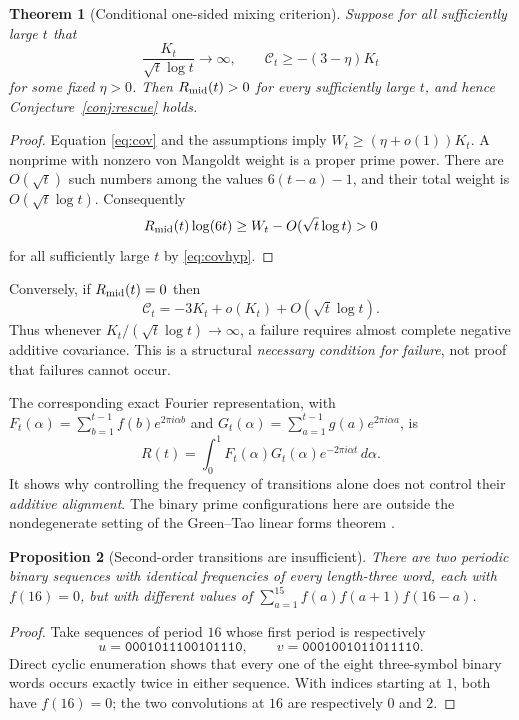\documentclass[11pt,a4paper]{article}
\newtheorem{theorem}{Theorem}[section]
\newtheorem{proposition}[theorem]{Proposition}
\theoremstyle{definition}
\begin{document}
\begin{theorem}[Conditional one-sided mixing criterion]\label{thm:cov}
Suppose for all sufficiently large $t$ that
\begin{equation}\label{eq:covhyp}
 \frac{K_t}{\sqrt t\log t}\longrightarrow\infty,
 \qquad \mathcal C_t\ge-(3-\eta)K_t
\end{equation}
for some fixed $\eta>0$. Then $R_{\rm mid}(t)>0$ for every
sufficiently large $t$, and hence Conjecture~\ref{conj:rescue} holds.
\end{theorem}
\begin{proof}
Equation \eqref{eq:cov} and the assumptions imply
$W_t\ge(\eta+o(1))K_t$. A nonprime with nonzero von Mangoldt
weight is a proper prime power. There are $O(\sqrt t)$ such
numbers among the values $6(t-a)-1$, and their total weight is
$O(\sqrt t\log t)$. Consequently
\[
 R_{\rm mid}(t)\log(6t)
 \ge W_t-O(\sqrt t\log t)>0
\]
for all sufficiently large $t$ by \eqref{eq:covhyp}.
\end{proof}

Conversely, if $R_{\rm mid}(t)=0$ then
\begin{equation}\label{eq:failurecov}
 \mathcal C_t=-3K_t+o(K_t)+O(\sqrt t\log t).
\end{equation}
Thus whenever $K_t/(\sqrt t\log t)\to\infty$, a failure requires
almost complete negative additive covariance. This is a structural
\emph{necessary condition for failure}, not proof that failures
cannot occur.

The corresponding exact Fourier representation, with
$F_t(\alpha)=\sum_{b=1}^{t-1}f(b)e^{2\pi i\alpha b}$ and
$G_t(\alpha)=\sum_{a=1}^{t-1}g(a)e^{2\pi i\alpha a}$, is
\begin{equation}\label{eq:fourier}
 R(t)=\int_0^1F_t(\alpha)G_t(\alpha)
                  e^{-2\pi i\alpha t}\,d\alpha.
\end{equation}
It shows why controlling the frequency of transitions alone does not
control their \emph{additive alignment}. The binary prime configurations
here are outside the nondegenerate setting of the Green--Tao linear
forms theorem \cite{GreenTao2010}.

\begin{proposition}[Second-order transitions are insufficient]
There are two periodic binary sequences with identical frequencies of
every length-three word, each with $f(16)=0$, but with different values
of $\sum_{a=1}^{15}f(a)f(a+1)f(16-a)$.
\end{proposition}
\begin{proof}
Take sequences of period $16$ whose first period is respectively
\[
 u=\texttt{0001011100101110},\qquad
 v=\texttt{0001001011011110}.
\]
Direct cyclic enumeration shows that every one of the eight
three-symbol binary words occurs exactly twice in either sequence.
With indices starting at $1$, both have $f(16)=0$; the two
convolutions at $16$ are respectively $0$ and $2$.
\end{proof}
\end{document}
